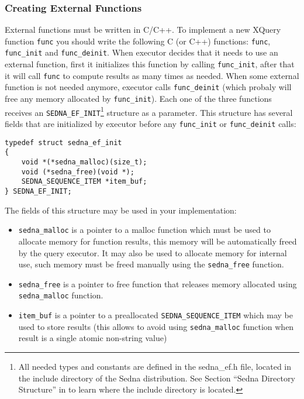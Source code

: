 \documentclass[a4paper,12pt]{article}
\begin{document}
\subsubsection*{Creating External Functions}
External functions must be written in C/C++. To implement a new XQuery
function \verb!func! you should write the following C (or C++) functions:
\verb!func!, \verb!func_init! and \verb!func_deinit!.
When executor decides that it needs to use an external function, first it
initializes this function by calling \verb!func_init!, after that it will
call \verb!func! to compute results as many times as needed. When some
external function is not needed anymore, executor calls \verb!func_deinit!
(which probaly will free any memory allocated by \verb!func_init!).
Each one of the three functions receives an \verb!SEDNA_EF_INIT!\footnote{All
needed types and constants are defined in the sedna\_ef.h file,
located in the include directory of the Sedna distribution.
See Section ``Sedna Directory Structure'' in \cite{doc:admin} to learn where the include directory is located.}
structure as a parameter. This structure has several fields that are
initialized by executor before any \verb!func_init! or \verb!func_deinit! calls:
\begin{verbatim}
typedef struct sedna_ef_init
{
    void *(*sedna_malloc)(size_t);
    void (*sedna_free)(void *);
    SEDNA_SEQUENCE_ITEM *item_buf;
} SEDNA_EF_INIT;
\end{verbatim}
The fields of this structure may be used in your implementation:
\begin{itemize}
	\item \verb!sedna_malloc! is a pointer to a malloc function which must be used to
	allocate memory for
	function results, this memory will be automatically freed by the query executor.
	It may also be used to allocate memory for internal use, such memory must be
	freed manually using the \verb!sedna_free! function.
	\item \verb!sedna_free! is a pointer to free function that releases memory
	allocated using \verb!sedna_malloc! function.
	\item \verb!item_buf! is a pointer to a preallocated \verb!SEDNA_SEQUENCE_ITEM!
	which may be used to store results
	(this allows to avoid using \verb!sedna_malloc! function when result is
	a single atomic non-string value)
\end{itemize}
\end{document}
